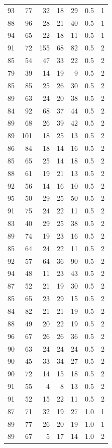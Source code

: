 \documentclass[
  11pt,
  a4paper,
]{scrartcl}
\begin{document}
\begin{longtable}[]{@{}rrrrrrl@{}}
93 & 77 & 32 & 18 & 29 & 0.5 & 1 \\
88 & 96 & 28 & 21 & 40 & 0.5 & 1 \\
94 & 65 & 22 & 18 & 11 & 0.5 & 1 \\
91 & 72 & 155 & 68 & 82 & 0.5 & 2 \\
85 & 54 & 47 & 33 & 22 & 0.5 & 2 \\
79 & 39 & 14 & 19 & 9 & 0.5 & 2 \\
85 & 85 & 25 & 26 & 30 & 0.5 & 2 \\
89 & 63 & 24 & 20 & 38 & 0.5 & 2 \\
84 & 92 & 68 & 37 & 44 & 0.5 & 2 \\
89 & 68 & 26 & 39 & 42 & 0.5 & 2 \\
89 & 101 & 18 & 25 & 13 & 0.5 & 2 \\
86 & 84 & 18 & 14 & 16 & 0.5 & 2 \\
85 & 65 & 25 & 14 & 18 & 0.5 & 2 \\
88 & 61 & 19 & 21 & 13 & 0.5 & 2 \\
92 & 56 & 14 & 16 & 10 & 0.5 & 2 \\
95 & 50 & 29 & 25 & 50 & 0.5 & 2 \\
91 & 75 & 24 & 22 & 11 & 0.5 & 2 \\
83 & 40 & 29 & 25 & 38 & 0.5 & 2 \\
89 & 74 & 19 & 23 & 16 & 0.5 & 2 \\
85 & 64 & 24 & 22 & 11 & 0.5 & 2 \\
92 & 57 & 64 & 36 & 90 & 0.5 & 2 \\
94 & 48 & 11 & 23 & 43 & 0.5 & 2 \\
87 & 52 & 21 & 19 & 30 & 0.5 & 2 \\
85 & 65 & 23 & 29 & 15 & 0.5 & 2 \\
84 & 82 & 21 & 21 & 19 & 0.5 & 2 \\
88 & 49 & 20 & 22 & 19 & 0.5 & 2 \\
96 & 67 & 26 & 26 & 36 & 0.5 & 2 \\
90 & 63 & 24 & 24 & 24 & 0.5 & 2 \\
90 & 45 & 33 & 34 & 27 & 0.5 & 2 \\
90 & 72 & 14 & 15 & 18 & 0.5 & 2 \\
91 & 55 & 4 & 8 & 13 & 0.5 & 2 \\
91 & 52 & 15 & 22 & 11 & 0.5 & 2 \\
87 & 71 & 32 & 19 & 27 & 1.0 & 1 \\
89 & 77 & 26 & 20 & 19 & 1.0 & 1 \\
89 & 67 & 5 & 17 & 14 & 1.0 & 2 \\

\end{longtable}
\end{document}
